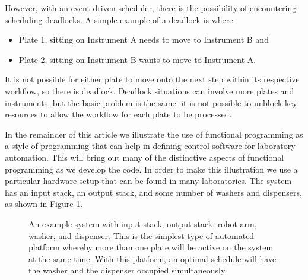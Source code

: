 \documentclass{article}
\begin{document}
However, with an event driven scheduler, there is the possibility of encountering scheduling deadlocks. A simple example of a deadlock is where:
\begin{itemize}
\item Plate 1, sitting on Instrument A needs to move to Instrument B and 
\item Plate 2, sitting on Instrument B wants to move to Instrument A.
\end{itemize} 

It is not possible for either plate to move onto the next step within its respective workflow, so there is deadlock. Deadlock situations can involve more plates and instruments, but the basic problem is the same: it is not possible to unblock key resources to allow the workflow for each plate to be processed.

In the remainder of this article we illustrate the use of functional programming as a style of programming that can help in defining control software for laboratory automation. This will bring out many of the distinctive aspects of functional programming as we develop the code. In order to make this illustration we use a particular hardware setup that can be found in many laboratories. The system has an input stack, an output stack, and some number of washers and dispensers, as shown in Figure \ref{fig:system}.

\begin{figure}
\caption{An example system with input stack, output stack, robot arm, washer, and dispenser. This is the simplest type of automated platform whereby more than one plate will be active on the system at the same time. With this platform, an optimal schedule will have the washer and the dispenser occupied simultaneously.}
\label{fig:system}
\end{figure}
\end{document}
